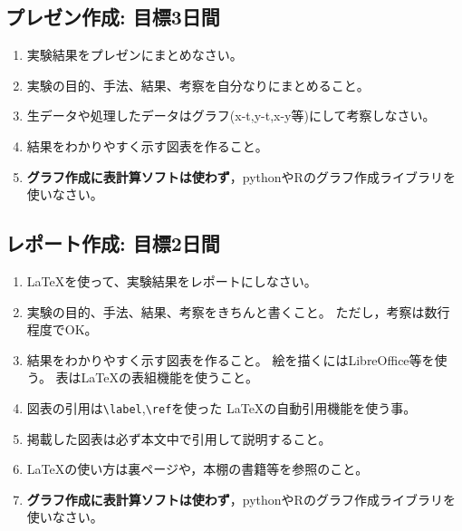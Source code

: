 \documentclass{jsarticle}
\begin{document}
\subsection{プレゼン作成: 目標3日間}
\begin{enumerate}
\item 実験結果をプレゼンにまとめなさい。
\item 実験の目的、手法、結果、考察を自分なりにまとめること。
\item 生データや処理したデータはグラフ(x-t,y-t,x-y等)にして考察しなさい。
\item 結果をわかりやすく示す図表を作ること。
\item \textbf{グラフ作成に表計算ソフトは使わず}，pythonやRのグラフ作成ライブラリを使いなさい。
\end{enumerate}

\subsection{レポート作成: 目標2日間}
\begin{enumerate}
\item \LaTeX を使って、実験結果をレポートにしなさい。
\item 実験の目的、手法、結果、考察をきちんと書くこと。  ただし，考察は数行程度でOK。
\item 結果をわかりやすく示す図表を作ること。 絵を描くにはLibreOffice等を使う。
  表は\LaTeX の表組機能を使うこと。
\item 図表の引用は\verb|\label|,\verb|\ref|を使った \LaTeX の自動引用機能を使う事。
\item 掲載した図表は必ず本文中で引用して説明すること。
\item \LaTeX の使い方は裏ページや，本棚の書籍等を参照のこと。
\item \textbf{グラフ作成に表計算ソフトは使わず}，pythonやRのグラフ作成ライブラリを使いなさい。
\end{enumerate}
\end{document}
